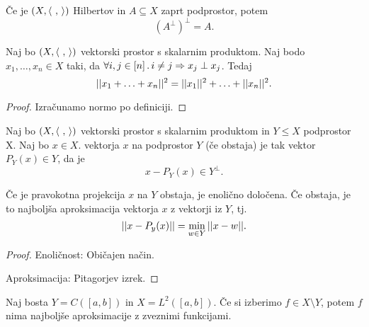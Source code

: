 \begin{opomba}
    Če je \((X, \left\langle \ , \,  \right\rangle)\) Hilbertov in \(A \subseteq X\) zaprt podprostor, potem \[(A^\perp)^\perp = A.\]
\end{opomba}

\begin{trditev}
    Naj bo \((X, \left\langle \ , \,  \right\rangle)\) vektorski prostor s skalarnim produktom. Naj bodo \(x_1, \ldots, x_n \in X\) taki, da \(\forall i, j \in [n] \,.\, i \neq j \Rightarrow x_j \perp x_j\). Tedaj 
    \[||x_1 + \ldots + x_n||^2 = ||x_1||^2 + \ldots + ||x_n||^2.\]
\end{trditev}

\begin{proof}
    Izračunamo normo po definiciji.
\end{proof}

\newpage
\begin{definicija}
    Naj bo \((X, \left\langle \ , \,  \right\rangle)\) vektorski prostor s skalarnim produktom in \(Y \leq X\) podprostor X. Naj bo \(x \in X\).  vektorja \(x\) na podprostor \(Y\) (če obstaja) je tak vektor \(P_Y(x) \in Y\), da je 
    \[x - P_Y(x) \in Y^\perp.\]
\end{definicija}

\begin{trditev}
    Če je pravokotna projekcija \(x\) na \(Y\) obstaja, je enolično določena. Če obstaja, je to najboljša aproksimacija vektorja \(x\) z vektorji iz \(Y\), tj.
    \[||x - P_y(x)|| = \min_{w \in Y} ||x - w||.\]
\end{trditev}

\begin{proof}
    Enoličnost: Običajen način.

    Aproksimacija: Pitagorjev izrek.
\end{proof}

\begin{zgled}
    Naj bosta \(Y = C([a,b])\) in \(X = L^2([a, b])\). Če si izberimo \(f \in X \setminus Y\), potem \(f\) nima najboljše aproksimacije z zveznimi funkcijami.
\end{zgled}

